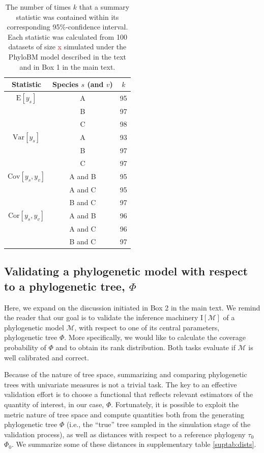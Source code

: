 \documentclass[oneside]{article}
\begin{document}
\begin{table}[h]
  \caption{The number of times $k$ that a summary
    statistic was contained within its corresponding
    95\%-confidence interval.
    Each statistic was calculated from 100 datasets of size
    \textcolor{red}{x} simulated
    under the PhyloBM model described in the text and in Box 1
    in the main text.}
  \label{suptab:bmsimcis}
  \centering
  \begin{tabular}{ c|c|c }
    \hline
    Statistic & Species $s$ (and $v$)& $k$\\
    \hline  
    $\text{E}[y_s]$ & A & 95\\
              & B & 97\\
              & C & 98\\
    $\text{Var}[y_s]$ & A & 93\\
              & B & 97\\
              & C & 97\\
    $\text{Cov}[y_s,y_v]$ & A and B & 95\\
              & A and C & 95\\
              & B and C & 97\\
    $\text{Cor}[y_s,y_v]$ & A and B & 96\\
              & A and C & 96\\
              & B and C & 97\\
    \hline
  \end{tabular}
\end{table}

\subsection{Validating a phylogenetic model with respect to a phylogenetic tree, $\Phi$}

Here, we expand on the discussion initiated in Box 2 in the main text.
We remind the reader that our goal is to validate the inference machinery
$\text{I}[\mathcal{M}]$ of a phylogenetic model $\mathcal{M}$, with
respect to one of its central parameters, phylogenetic tree $\Phi$.
More specifically, we would like to calculate the coverage probability of
$\Phi$ and to obtain its rank distribution.
Both tasks evaluate if $\mathcal{M}$ is well calibrated and correct.

Because of the nature of tree space, summarizing and comparing phylogenetic
trees with univariate measures is not a trivial task.
The key to an effective validation effort is to choose a functional
that reflects relevant estimators of the quantity of interest, in our case,
$\Phi$.
Fortunately, it is possible to exploit the metric nature of tree space and compute
quantities both from the generating phylogenetic tree $\Phi$ (i.e., the ``true''
tree sampled in the simulation stage of the validation process), as well as distances 
with respect to a reference phylogeny \st{$\tau_0$} $\Phi_0$.
We summarize some of these distances in supplementary table \ref{suptab:dists}.
\end{document}
